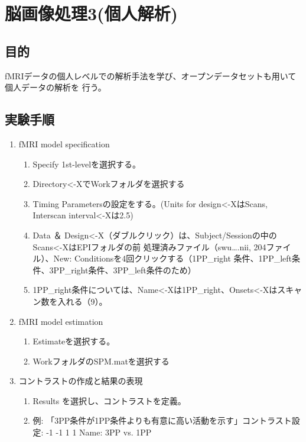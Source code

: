 \documentclass{jlreq}
\begin{document}
\section{脳画像処理3(個人解析)}
\subsection{目的}
fMRIデータの個人レベルでの解析手法を学び、オープンデータセットも用いて個人データの解析を
行う。
\subsection{実験手順}
\begin{enumerate}
    \item fMRI model specification
    \begin{enumerate}
        \item Specify 1st-levelを選択する。
        \item Directory<-XでWorkフォルダを選択する
        \item Timing Parametersの設定をする。(Units for design<-XはScans, Interscan interval<-Xは2.5)
        \item Data ＆ Design<-X（ダブルクリック）は、Subject/Sessionの中のScans<-XはEPIフォルダの前
処理済みファイル（swu….nii, 204ファイル）、New: Conditionsを4回クリックする（1PP\_right
条件、1PP\_left条件、3PP\_right条件、3PP\_left条件のため）
        \item 1PP\_right条件については、Name<-Xは1PP\_right、Onsets<-Xはスキャン数を入れる（9）。
    \end{enumerate}

    \item fMRI model estimation
    \begin{enumerate}
        \item Estimateを選択する。
        \item WorkフォルダのSPM.matを選択する
    \end{enumerate}

    \item コントラストの作成と結果の表現
    \begin{enumerate}
        \item Results を選択し、コントラストを定義。
        \item 例: 「3PP条件が1PP条件よりも有意に高い活動を示す」コントラスト設定: -1 -1 1 1 Name: 3PP vs. 1PP
    \end{enumerate}
\end{enumerate}
\end{document}
